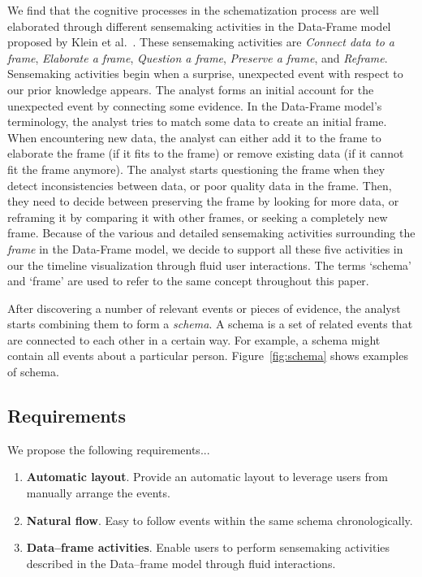 We find that the cognitive processes in the schematization process are well elaborated through different sensemaking activities in the Data-Frame model proposed by Klein et al.~\cite{Klein2003}. These sensemaking activities are \emph{Connect data to a frame}, \emph{Elaborate a frame}, \emph{Question a frame}, \emph{Preserve a frame}, and \emph{Reframe}. Sensemaking activities begin when a surprise, unexpected event with respect to our prior knowledge appears. The analyst forms an initial account for the unexpected event by connecting some evidence. In the Data-Frame model's terminology, the analyst tries to match some data to create an initial frame. When encountering new data, the analyst can either add it to the frame to elaborate the frame (if it fits to the frame) or remove existing data (if it cannot fit the frame anymore). The analyst starts questioning the frame when they detect inconsistencies between data, or poor quality data in the frame. Then, they need to decide between preserving the frame by looking for more data, or reframing it by comparing it with other frames, or seeking a completely new frame. Because of the various and detailed sensemaking activities surrounding the \textit{frame} in the Data-Frame model, we decide to support all these five activities in our the timeline visualization through fluid user interactions. The terms `schema' and `frame' are used to refer to the same concept throughout this paper.

After discovering a number of relevant events or pieces of evidence, the analyst starts combining them to form a \textit{schema}. A schema is a set of related events that are connected to each other in a certain way. For example, a schema might contain all events about a particular person. Figure~\ref{fig:schema} shows examples of schema. 

\subsection{Requirements}
We propose the following requirements...
\begin{enumerate}
	\item \textbf{Automatic layout}. Provide an automatic layout to leverage users from manually arrange the events.
	\item \textbf{Natural flow}. Easy to follow events within the same schema chronologically.
	\item \textbf{Data--frame activities}. Enable users to perform sensemaking activities described in the Data--frame model through fluid interactions.
\end{enumerate}

